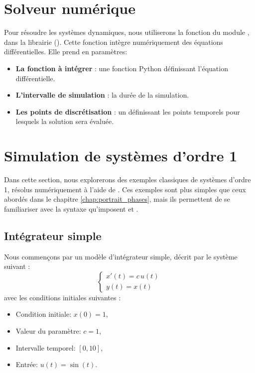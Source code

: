     \section{Solveur numérique}
        Pour résoudre les systèmes dynamiques, nous utiliserons la fonction  du module , dans la librairie  (\cite{Scipy2020}). Cette fonction intègre numériquement des équations différentielles.  Elle prend en paramètres:
        \begin{itemize}
            \item \textbf{La fonction à intégrer} : une fonction Python définissant l’équation différentielle.
            \item \textbf{L'intervalle de simulation} : la durée de la simulation.
            \item \textbf{Les points de discrétisation} : un  définissant les points temporels pour lesquels la solution sera évaluée.
        \end{itemize}

    \section{Simulation de systèmes d'ordre 1}
        Dans cette section, nous explorerons des exemples classiques de systèmes d'ordre 1, résolus numériquement à l'aide de . Ces exemples sont plus simples que ceux abordés dans le chapitre \ref{chap:portrait_phases}, mais ils permettent de se familiariser avec la syntaxe qu'imposent  et .
    
        \subsection{Intégrateur simple}
            Nous commençons par un modèle d'intégrateur simple, décrit par le système suivant  :
            \begin{equation*}
                \begin{cases}
                    x'(t)=c\,u(t)\\
                    y(t)=x(t)
                \end{cases}
            \end{equation*}
            avec les conditions initiales suivantes :
            \begin{itemize}
                \item Condition initiale: $x(0)=1$,
                \item Valeur du paramètre: $c=1$,
                \item Intervalle temporel: $[0,10]$,
                \item Entrée: $u(t)=\sin(t)$.
            \end{itemize}

